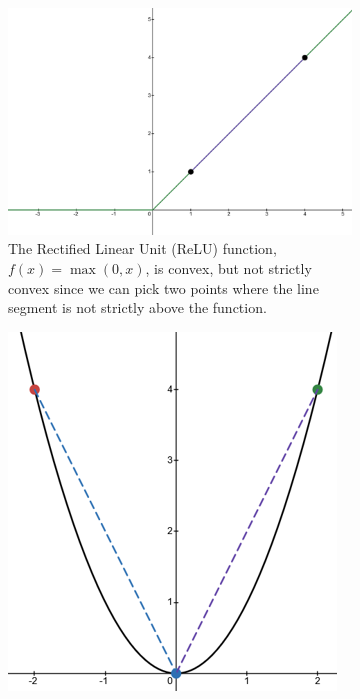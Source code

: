 
\begin{figure}[h]

    \begin{subfigure}[b]{0.48\linewidth}

        \centering

        \includegraphics[width=0.8\linewidth]{figures/2background/relu.png}

        \caption{The Rectified Linear Unit (ReLU) function, $f(x) = \max(0, x)$, is convex, but not strictly convex since we can pick two points where the line segment is not strictly above the function.}

        \label{fig:convex_relu}

    \end{subfigure}

    \hfill

    \begin{subfigure}[b]{0.48\linewidth}

        \centering

        \includegraphics[width=0.6\linewidth]{figures/2background/parabola.png}


\end{subfigure}
\end{figure}
